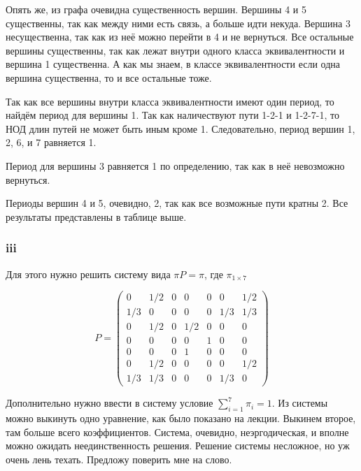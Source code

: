 \documentclass[a4paper,12pt]{article}
\begin{document}
Опять же, из графа очевидна существенность вершин. Вершины 4 и 5 существенны, так как между ними есть связь, а больше идти некуда. Вершина 3 несущественна, так как из неё можно перейти в 4 и не вернуться. Все остальные вершины существенны, так как лежат внутри одного класса эквивалентности и вершина 1 существенна. А как мы знаем, в классе эквивалентности если одна вершина существенна, то и все остальные тоже. 

Так как все вершины внутри класса эквивалентности имеют один период, то найдём период для вершины 1. Так как наличествуют пути 1-2-1 и 1-2-7-1, то НОД длин путей не может быть иным кроме 1. Следовательно, период вершин 1, 2, 6, и 7 равняется 1.

Период для вершины 3 равняется 1 по определению, так как в неё невозможно вернуться.

Периоды вершин 4 и 5, очевидно, 2, так как все возможные пути кратны 2. Все результаты представлены в таблице выше. 

\subsubsection{iii} 

Для этого нужно решить систему вида $ \pi P = \pi  $, где $ \pi_{1\times7} $

\[
P=\left(\begin{array}{ccccccc}{0} & {1 / 2} & {0} & {0} & {0} & {0} & {1 / 2} \\ {1 / 3} & {0} & {0} & {0} & {0} & {1 / 3} & {1 / 3} \\ {0} & {1 / 2} & {0} & {1 / 2} & {0} & {0} & {0} \\ {0} & {0} & {0} & {0} & {1} & {0} & {0} \\ {0} & {0} & {0} & {1} & {0} & {0} & {0} \\ {0} & {1 / 2} & {0} & {0} & {0} & {0} & {1 / 2} \\ {1 / 3} & {1 / 3} & {0} & {0} & {0} & {1 / 3} & {0}\end{array}\right)
\]

Дополнительно нужно ввести в систему условие $ \sum_{i=1}^7 \pi_i = 1$. Из системы можно выкинуть одно уравнение, как было показано на лекции. Выкинем второе, там больше всего коэффициентов. Система, очевидно, неэргодическая, и вполне можно ожидать неединственность решения. Решение системы несложное, но уж очень лень техать. Предложу поверить мне на слово.
\end{document}
